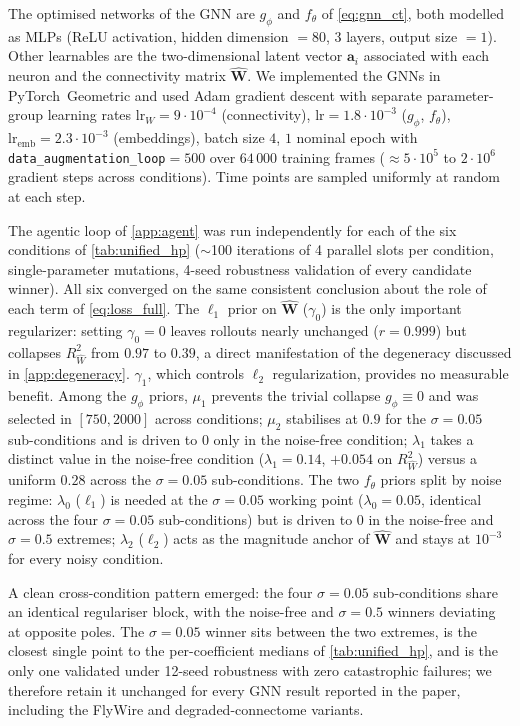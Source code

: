 \documentclass{article}
\begin{document}
The optimised networks of the GNN are $g_\phi$ and $f_\theta$ of
\cref{eq:gnn_ct}, both modelled as MLPs (ReLU activation, hidden
dimension $=80$, $3$ layers, output size $=1$). Other learnables are
the two-dimensional latent vector $\mathbf{a}_i$ associated with each
neuron and the connectivity matrix $\hat{\mathbf W}$. We implemented
the GNNs in PyTorch~Geometric \citep{fey_fast_2019} and used Adam
gradient descent with separate parameter-group learning rates
$\text{lr}_W\!=\!9{\cdot}10^{-4}$ (connectivity),
$\text{lr}\!=\!1.8{\cdot}10^{-3}$ ($g_\phi$, $f_\theta$),
$\text{lr}_\text{emb}\!=\!2.3{\cdot}10^{-3}$ (embeddings), batch size
$4$, $1$ nominal epoch with
\texttt{data\_augmentation\_loop}$=500$ over $64\,000$ training
frames (${\approx}5{\cdot}10^{5}$ to $2{\cdot}10^{6}$ gradient steps
across conditions). Time points are sampled uniformly at random at
each step.

The agentic loop of \cref{app:agent} was run independently
for each of the six conditions of \cref{tab:unified_hp}
($\sim$100 iterations of 4 parallel slots per condition,
single-parameter mutations, 4-seed robustness validation of every
candidate winner). All six converged on the same consistent conclusion
about the role of each term of \cref{eq:loss_full}. The
$\ell_1$ prior on $\hat{\mathbf W}$ ($\gamma_0$) is the only
important regularizer: setting $\gamma_0\!=\!0$ leaves rollouts
nearly unchanged ($r\!=\!0.999$) but collapses $R^2_{\hat W}$ from
$0.97$ to $0.39$, a direct manifestation of the degeneracy discussed in
\cref{app:degeneracy}. $\gamma_1$, which controls $\ell_2$ regularization,
provides no measurable benefit.
Among the $g_\phi$ priors, $\mu_1$
prevents the trivial collapse $g_\phi\!\equiv\!0$ and was selected in
$[750, 2000]$ across conditions; $\mu_2$ stabilises at $0.9$ for the
$\sigma=0.05$ sub-conditions and is driven to 0 only in the noise-free condition;
$\lambda_1$ takes a distinct value in the
noise-free condition ($\lambda_1\!=\!0.14$, $+0.054$ on
$R^2_{\hat W}$) versus a uniform $0.28$ across the $\sigma=0.05$ 
sub-conditions. The two $f_\theta$ priors split by noise regime:
$\lambda_0$ ($\ell_1$) is needed at the $\sigma=0.05$  working point
($\lambda_0\!=\!0.05$, identical across the four $\sigma=0.05$ 
sub-conditions) but is driven to $0$ in the noise-free and $\sigma=0.5$ 
extremes; $\lambda_2$ ($\ell_2$) acts as the magnitude anchor of
$\hat{\mathbf W}$ and stays at $10^{-3}$ for every noisy condition.

A clean cross-condition pattern emerged: the four $\sigma{=}0.05$
sub-conditions share an identical regulariser block, with the
noise-free and $\sigma{=}0.5$ winners deviating at opposite poles.
The $\sigma{=}0.05$ winner sits between the two extremes, is the
closest single point to the per-coefficient medians of
\cref{tab:unified_hp}, and is the only one validated under
12-seed robustness with zero catastrophic failures; we therefore
retain it unchanged for every GNN result reported in the paper,
including the FlyWire and degraded-connectome variants.
\end{document}
